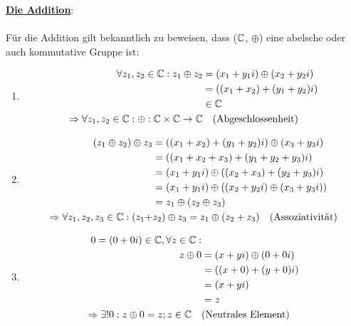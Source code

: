 \documentclass[../MAIN/main.tex]{subfiles}
\begin{document}
	\begin{Beweis}
		\underline{\textbf{Die Addition}}:

		\paragraph{} Für die Addition gilt bekanntlich zu beweisen, dass ($\mathbb{C}$, $\oplus$) eine abelsche oder auch kommutative Gruppe ist:

		\begin{enumerate}[1)]
			\item \begin{align*}
						\forall z_1, z_2 \in \C: z_1 \oplus z_2 &\definedBy (x_1 + y_1i) \oplus (x_2 + y_2i) \\
														   		&= ((x_1 + x_2) + (y_1 + y_2)i) \\
														   		&\in \C \\
						\Rightarrow \forall z_1, z_2 \in \C: \oplus : \C \times \C \rightarrow \C & \quad \text{(Abgeschlossenheit)}
				  \end{align*}
			\item \begin{align*}
				  		(z_1 \oplus z_2) \oplus z_3 &= ((x_1 + x_2) + (y_1 + y_2)i) \oplus (x_3 + y_3i) \\
										  			&= ((x_1 + x_2 + x_3) + (y_1 + y_2 + y_3)i) \\
												    &= (x_1 + y_1i) \oplus ((x_2 + x_3) + (y_2 + y_3)i) \\
												    &= (x_1 + y_1i) \oplus ((x_2 + y_2i) \oplus (x_3 + y_3i)) \\
												    &= z_1 \oplus (z_2 \oplus z_3) \\
						\Rightarrow \forall z_1, z_2, z_3 \in \mathbb{C}: (z_1 + &z_2) \oplus  z_3 = z_1 \oplus (z_2 + z_3) \quad \text{(Assoziativität)}
				  \end{align*}
			\item \begin{align*}
						0 = (0 + 0i) \in \mathbb{C}, \forall z \in \mathbb{C}:& \\
												   z \oplus 0 &= (x + yi) \oplus (0 + 0i) \\
													  		  &= ((x + 0) + (y + 0)i) \\
															  &= (x + yi) \\
															  &= z \\
						\Rightarrow \exists! 0: z \oplus 0 = z; z \in \mathbb{C} \quad &\text{(Neutrales Element)}
				  \end{align*}

\end{enumerate}
\end{Beweis}
\end{document}
